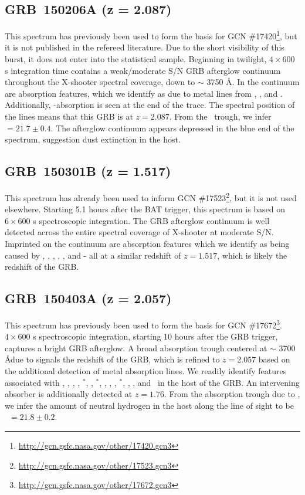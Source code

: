 \documentclass{aa}    %
\begin{document}
\subsection{GRB~150206A (z = 2.087)}	

This spectrum has previously been used to form the basis for GCN
\#17420\footnote{\url{http://gcn.gsfc.nasa.gov/other/17420.gcn3}}, but it is not
published in the refereed literature. Due to the short visibility of this burst,
it does not enter into the statistical sample. Beginning in twilight,
$4\times600$ s integration time contains a weak/moderate S/N GRB afterglow
continuum throughout the X-shooter spectral coverage, down to $\sim$ 3750 \AA.
In the continuum are absorption features, which we identify as due to metal
lines from \znii, \feii, and \mgii. Additionally, \lya-absorption is seen at the
end of the trace. The spectral position of the lines means that this GRB is at
$z = 2.087$. From the \lya~trough, we infer \nh~$=21.7 \pm 0.4$. The afterglow
continuum appears depressed in the blue end of the spectrum, suggestion dust
extinction in the host.

\subsection{GRB~150301B (z = 1.517)}	

This spectrum has already been used to inform GCN
\#17523\footnote{\url{http://gcn.gsfc.nasa.gov/other/17523.gcn3}}, but it is not
used elsewhere. Starting 5.1 hours after the BAT trigger, this spectrum is based
on $6 \times 600$ s spectroscopic integration. The GRB afterglow continuum is
well detected across the entire spectral coverage of X-shooter at moderate S/N.
Imprinted on the continuum are absorption features which we identify as being
caused by \SIii, \civ, \alii, \feii, \mgii, and \mgi - all at a similar redshift
of $z = 1.517$, which is likely the redshift of the GRB.

\subsection{GRB~150403A (z = 2.057)}	

This spectrum has previously been used to form the basis for GCN
\#17672\footnote{\url{http://gcn.gsfc.nasa.gov/other/17672.gcn3}}. $4 \times
600$ s spectroscopic integration, starting 10 hours after the GRB trigger,
captures a bright GRB afterglow. A broad absorption trough centered at $\sim$
3700 \AA due to \lya signals the redshift of the GRB, which is refined to $z =
2.057$ based on the additional detection of metal absorption lines. We readily
identify features associated with \sii, \SIiv, \oi, \SIii, \SIii$^*$, \cii,
\cii$^*$, \civ, \alii, \feii, \feii$^*$, \mni, \mgii, and \mgi~in the host of
the GRB. An intervening \civ absorber is additionally detected at $z=1.76$. From
the absorption trough due to \lya, we infer the amount of neutral hydrogen in
the host along the line of sight to be \nh~$=21.8 \pm 0.2$.
\end{document}
